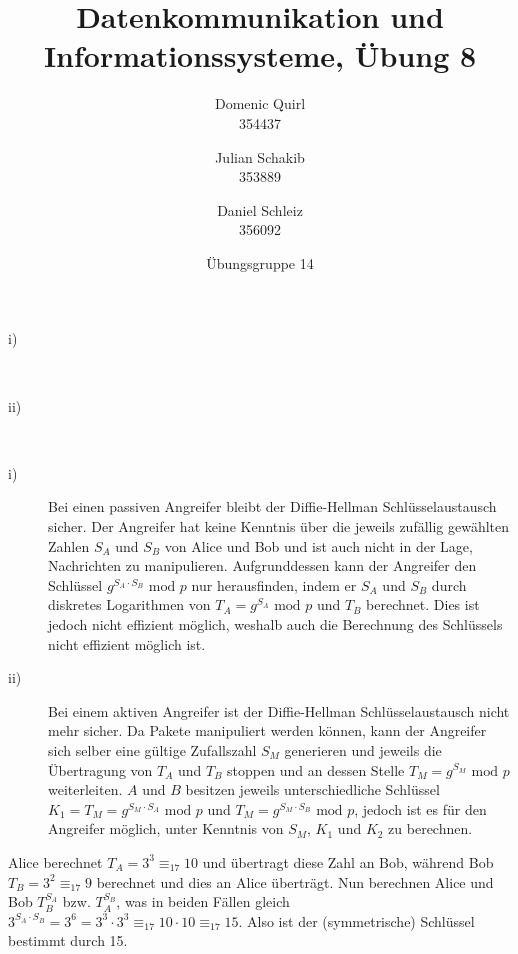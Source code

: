 \documentclass{../exercisesheet}
\title{Datenkommunikation und Informationssysteme, Übung 8}
\author{
    Domenic Quirl \\ 354437
    \and
    Julian Schakib \\ 353889
    \and 
    Daniel Schleiz \\ 356092
}
\date{Übungsgruppe 14}
\begin{document}
\maketitle
\pointtable


\begin{exercise}{6}
\begin{subexercise}

\end{subexercise}
\begin{subexercise}
\begin{description}
\item[i)] \ \\

\item[ii)] \ \\

\end{description}
\end{subexercise}
\begin{subexercise}

\end{subexercise}
\end{exercise}


\begin{exercise}{4}
\begin{subexercise}
\begin{description}
\item[i)] Bei einen passiven Angreifer bleibt der Diffie-Hellman Schlüsselaustausch sicher. Der Angreifer hat keine Kenntnis über die jeweils zufällig gewählten Zahlen $S_A$ und $S_B$
von Alice und Bob und ist auch nicht in der Lage, Nachrichten zu manipulieren. Aufgrunddessen kann der Angreifer den Schlüssel $g^{S_A \cdot S_B} \text{ mod } p$ nur herausfinden, 
indem er $S_A$ und $S_B$ durch diskretes Logarithmen von $T_A=g^{S_A} \text{ mod }p$ und $T_B$ berechnet. Dies ist jedoch nicht effizient möglich, weshalb auch die Berechnung
des Schlüssels nicht effizient möglich ist.

\item[ii)] Bei einem aktiven Angreifer ist der Diffie-Hellman Schlüsselaustausch nicht mehr sicher. Da Pakete manipuliert werden können, kann der Angreifer sich selber eine gültige Zufallszahl
$S_M$ generieren und jeweils die Übertragung von $T_A$ und $T_B$ stoppen und an dessen Stelle $T_M=g^{S_M} \text{ mod }p$ weiterleiten. $A$ und $B$ besitzen jeweils
unterschiedliche Schlüssel $K_1=T_M=g^{S_M \cdot S_A} \text{ mod }p$ und $T_M=g^{S_M \cdot S_B} \text{ mod }p$, jedoch ist es für den Angreifer möglich, unter Kenntnis
von $S_M$, $K_1$ und $K_2$ zu berechnen.
\end{description}
\end{subexercise}
\begin{subexercise}
Alice berechnet $T_A=3^3 \equiv_{17} 10$ und übertragt diese Zahl an Bob, während Bob $T_B=3^2 \equiv_{17} 9$ berechnet und dies an Alice überträgt.
Nun berechnen Alice und Bob $T_B^{S_A}$ bzw. $T_A^{S_B}$, was in beiden Fällen gleich $3^{S_A \cdot S_B} = 3^6 = 3^3 \cdot 3^3 \equiv_{17} 10 \cdot 10 \equiv_{17} 15$.
Also ist der (symmetrische) Schlüssel bestimmt durch 15.
\end{subexercise}
\end{exercise}
\end{document}
